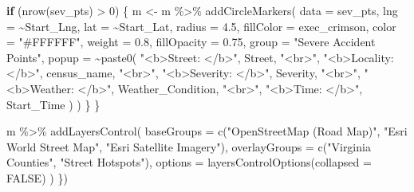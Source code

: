 \documentclass[
  letterpaper,
  DIV=11,
  numbers=noendperiod]{scrartcl}
\newenvironment{Shaded}{\begin{snugshade}}{\end{snugshade}}
\newcommand{\AttributeTok}[1]{\textcolor[rgb]{0.40,0.45,0.13}{#1}}
\newcommand{\ConstantTok}[1]{\textcolor[rgb]{0.56,0.35,0.01}{#1}}
\newcommand{\ControlFlowTok}[1]{\textcolor[rgb]{0.00,0.23,0.31}{\textbf{#1}}}
\newcommand{\DecValTok}[1]{\textcolor[rgb]{0.68,0.00,0.00}{#1}}
\newcommand{\FloatTok}[1]{\textcolor[rgb]{0.68,0.00,0.00}{#1}}
\newcommand{\FunctionTok}[1]{\textcolor[rgb]{0.28,0.35,0.67}{#1}}
\newcommand{\NormalTok}[1]{\textcolor[rgb]{0.00,0.23,0.31}{#1}}
\newcommand{\OtherTok}[1]{\textcolor[rgb]{0.00,0.23,0.31}{#1}}
\newcommand{\SpecialCharTok}[1]{\textcolor[rgb]{0.37,0.37,0.37}{#1}}
\newcommand{\StringTok}[1]{\textcolor[rgb]{0.13,0.47,0.30}{#1}}
\begin{document}
\begin{Shaded}
\begin{Highlighting}[]
      \ControlFlowTok{if}\NormalTok{ (}\FunctionTok{nrow}\NormalTok{(sev\_pts) }\SpecialCharTok{\textgreater{}} \DecValTok{0}\NormalTok{) \{}
\NormalTok{        m }\OtherTok{\textless{}{-}}\NormalTok{ m }\SpecialCharTok{\%\textgreater{}\%}
          \FunctionTok{addCircleMarkers}\NormalTok{(}
            \AttributeTok{data        =}\NormalTok{ sev\_pts,}
            \AttributeTok{lng         =} \SpecialCharTok{\textasciitilde{}}\NormalTok{Start\_Lng,}
            \AttributeTok{lat         =} \SpecialCharTok{\textasciitilde{}}\NormalTok{Start\_Lat,}
            \AttributeTok{radius      =} \FloatTok{4.5}\NormalTok{,}
            \AttributeTok{fillColor   =}\NormalTok{ exec\_crimson,}
            \AttributeTok{color       =} \StringTok{"\#FFFFFF"}\NormalTok{,}
            \AttributeTok{weight      =} \FloatTok{0.8}\NormalTok{,}
            \AttributeTok{fillOpacity =} \FloatTok{0.75}\NormalTok{,}
            \AttributeTok{group       =} \StringTok{"Severe Accident Points"}\NormalTok{,}
            \AttributeTok{popup       =} \SpecialCharTok{\textasciitilde{}}\FunctionTok{paste0}\NormalTok{(}
              \StringTok{"\textless{}b\textgreater{}Street: \textless{}/b\textgreater{}"}\NormalTok{, Street, }\StringTok{"\textless{}br\textgreater{}"}\NormalTok{,}
              \StringTok{"\textless{}b\textgreater{}Locality: \textless{}/b\textgreater{}"}\NormalTok{, census\_name, }\StringTok{"\textless{}br\textgreater{}"}\NormalTok{,}
              \StringTok{"\textless{}b\textgreater{}Severity: \textless{}/b\textgreater{}"}\NormalTok{, Severity, }\StringTok{"\textless{}br\textgreater{}"}\NormalTok{,}
              \StringTok{"\textless{}b\textgreater{}Weather: \textless{}/b\textgreater{}"}\NormalTok{, Weather\_Condition, }\StringTok{"\textless{}br\textgreater{}"}\NormalTok{,}
              \StringTok{"\textless{}b\textgreater{}Time: \textless{}/b\textgreater{}"}\NormalTok{, Start\_Time}
\NormalTok{            )}
\NormalTok{          )}
\NormalTok{      \}}
\NormalTok{    \}}

\NormalTok{    m }\SpecialCharTok{\%\textgreater{}\%}
      \FunctionTok{addLayersControl}\NormalTok{(}
        \AttributeTok{baseGroups    =} \FunctionTok{c}\NormalTok{(}\StringTok{"OpenStreetMap (Road Map)"}\NormalTok{, }\StringTok{"Esri World Street Map"}\NormalTok{, }\StringTok{"Esri Satellite Imagery"}\NormalTok{),}
        \AttributeTok{overlayGroups =} \FunctionTok{c}\NormalTok{(}\StringTok{"Virginia Counties"}\NormalTok{, }\StringTok{"Street Hotspots"}\NormalTok{),}
        \AttributeTok{options       =} \FunctionTok{layersControlOptions}\NormalTok{(}\AttributeTok{collapsed =} \ConstantTok{FALSE}\NormalTok{)}
\NormalTok{      )}
\NormalTok{  \})}


\end{Highlighting}
\end{Shaded}
\end{document}
